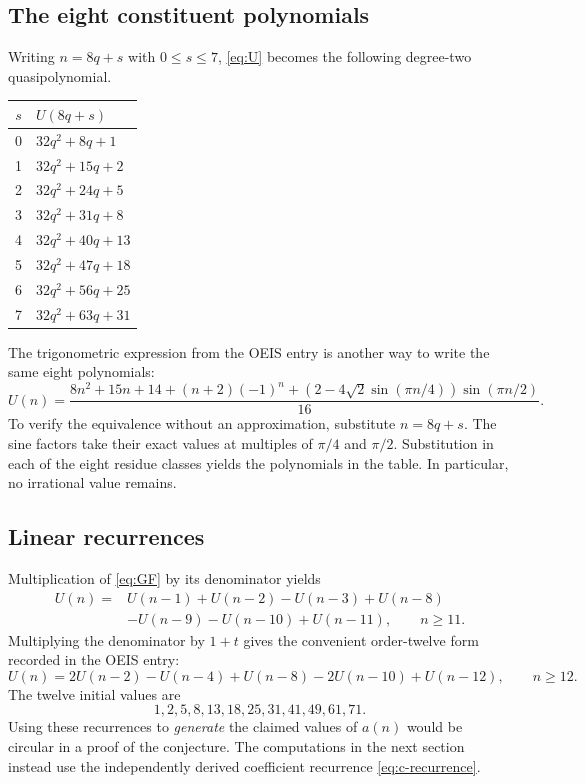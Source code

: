 \documentclass[11pt]{article}
\numberwithin{equation}{section}
\theoremstyle{definition}
\theoremstyle{remark}
\newcommand{\U}{U}
\begin{document}
\subsection{The eight constituent polynomials}
Writing $n=8q+s$ with $0\le s\le7$, \eqref{eq:U} becomes the following
degree-two quasipolynomial.
\begin{center}
\begin{tabular}{cl}
\toprule
$s$ & $\U(8q+s)$\\
\midrule
0 & $32q^2+8q+1$\\
1 & $32q^2+15q+2$\\
2 & $32q^2+24q+5$\\
3 & $32q^2+31q+8$\\
4 & $32q^2+40q+13$\\
5 & $32q^2+47q+18$\\
6 & $32q^2+56q+25$\\
7 & $32q^2+63q+31$\\
\bottomrule
\end{tabular}
\end{center}
The trigonometric expression from the OEIS entry is another way to write
the same eight polynomials:
\begin{equation}\label{eq:trig}
 \U(n)=\frac{8n^2+15n+14+(n+2)(-1)^n
 +(2-4\sqrt2\sin(\pi n/4))\sin(\pi n/2)}{16}.
\end{equation}
To verify the equivalence without an approximation, substitute $n=8q+s$.
The sine factors take their exact values at multiples of $\pi/4$ and
$\pi/2$. Substitution in each of the eight residue classes yields the
polynomials in the table. In particular, no irrational value remains.

\subsection{Linear recurrences}
Multiplication of \eqref{eq:GF} by its denominator yields
\begin{equation}\label{eq:rec11}
 \begin{split}
 \U(n)={}&\U(n-1)+\U(n-2)-\U(n-3)+\U(n-8)\\
         &-\U(n-9)-\U(n-10)+\U(n-11),\qquad n\ge11.
 \end{split}
\end{equation}
Multiplying the denominator by $1+t$ gives the convenient order-twelve
form recorded in the OEIS entry:
\begin{equation}\label{eq:rec12}
 \U(n)=2\U(n-2)-\U(n-4)+\U(n-8)-2\U(n-10)+\U(n-12),
 \qquad n\ge12.
\end{equation}
The twelve initial values are
\[
 1,2,5,8,13,18,25,31,41,49,61,71.
\]
Using these recurrences to \emph{generate} the claimed values of $a(n)$
would be circular in a proof of the conjecture. The computations in the
next section instead use the independently derived coefficient recurrence
\eqref{eq:c-recurrence}.
\end{document}
